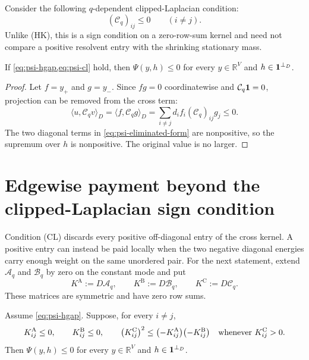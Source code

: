\documentclass[11pt]{article}
\begin{document}
Consider the following $q$-dependent clipped-Laplacian condition:
\begin{equation}
 (\mathcal C_q)_{ij}\leq0
 \qquad(i\neq j).
 \label{eq:psi-cl}
\end{equation}
Unlike \textup{(HK)}, this is a sign condition on a zero-row-sum kernel and
need not compare a positive resolvent entry with the shrinking stationary
mass.

\begin{theorem}
\label{thm:psi-cl}
If \cref{eq:psi-hgap,eq:psi-cl} hold, then
$\Psi(y,h)\leq0$ for every $y\in\mathbb R^V$ and
$h\in\mathbf{1}^{\perp_D}$.
\end{theorem}

\begin{proof}
Let $f=y_+$ and $g=y_-$.  Since $fg=0$ coordinatewise and
$\mathcal C_q\mathbf{1}=0$, projection can be removed from the cross term:
\begin{equation}
 \langle u,\mathcal C_qv\rangle_D
 =\langle f,\mathcal C_qg\rangle_D
 =\sum_{i\neq j}d_if_i(\mathcal C_q)_{ij}g_j\leq0.
 \label{eq:psi-cl-cross}
\end{equation}
The two diagonal terms in \cref{eq:psi-eliminated-form} are nonpositive,
so the supremum over $h$ is nonpositive.  The original value is no larger.
\end{proof}

\section{Edgewise payment beyond the clipped-Laplacian sign condition}

Condition \textup{(CL)} discards every positive off-diagonal entry of the
cross kernel.  A positive entry can instead be paid locally when the two
negative diagonal energies carry enough weight on the same unordered pair.
For the next statement, extend $\mathcal A_q$ and $\mathcal B_q$ by zero on
the constant mode and put
\begin{equation*}
 K^{\mathrm A}:=D\mathcal A_q,
 \qquad K^{\mathrm B}:=D\mathcal B_q,
 \qquad K^{\mathrm C}:=D\mathcal C_q.
\end{equation*}
These matrices are symmetric and have zero row sums.

\begin{theorem}
\label{thm:psi-edgewise-young}
Assume \cref{eq:psi-hgap}.  Suppose, for every $i\neq j$,
\begin{equation}
 K^{\mathrm A}_{ij}\leq0,
 \qquad K^{\mathrm B}_{ij}\leq0,
 \qquad
 \bigl(K^{\mathrm C}_{ij}\bigr)^2
 \leq
 \bigl(-K^{\mathrm A}_{ij}\bigr)
 \bigl(-K^{\mathrm B}_{ij}\bigr)
 \quad\hbox{whenever }K^{\mathrm C}_{ij}>0.
 \label{eq:psi-edgewise-young-condition}
\end{equation}
Then $\Psi(y,h)\leq0$ for every $y\in\mathbb R^V$ and
$h\in\mathbf{1}^{\perp_D}$.
\end{theorem}
\end{document}
